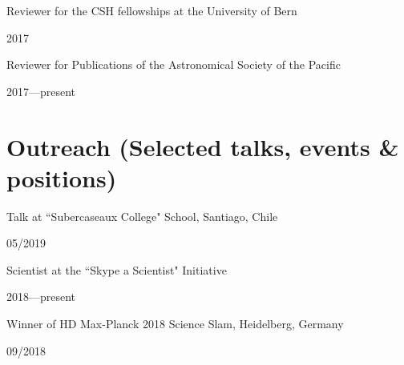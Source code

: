 \documentclass[12pt, a4paper]{article} %
\begin{document}
\begin{minipage}[t]{0.7\textwidth}
\begin{flushleft}%
  \setlength{\leftskip}{0.2cm}%
Reviewer for the CSH fellowships at the University of Bern 
\end{flushleft}
\end{minipage}
\begin{minipage}[t]{0.3\textwidth}
\hfill 2017
\end{minipage}

\begin{minipage}[t]{0.7\textwidth}
\begin{flushleft}%
  \setlength{\leftskip}{0.2cm}%
Reviewer for Publications of the Astronomical Society of the Pacific 
\end{flushleft}
\end{minipage}
\begin{minipage}[t]{0.3\textwidth}
\hfill 2017---present
\end{minipage}

\section*{Outreach (Selected talks, events \& positions)}

\begin{minipage}[t]{0.7\textwidth}
\begin{flushleft}%
  \setlength{\leftskip}{0.2cm}%
Talk at ``Subercaseaux College" School, Santiago, Chile
\end{flushleft}
\end{minipage}
\begin{minipage}[t]{0.3\textwidth}
\hfill 05/2019
\end{minipage}

\begin{minipage}[t]{0.7\textwidth}
\begin{flushleft}%
  \setlength{\leftskip}{0.2cm}%
Scientist at the ``Skype a Scientist" Initiative
\end{flushleft}
\end{minipage}
\begin{minipage}[t]{0.3\textwidth}
\hfill 2018---present
\end{minipage}

\begin{minipage}[t]{0.7\textwidth}
\begin{flushleft}%
  \setlength{\leftskip}{0.2cm}%
Winner of HD Max-Planck 2018 Science Slam, Heidelberg, Germany 
\end{flushleft}
\end{minipage}
\begin{minipage}[t]{0.3\textwidth}
\hfill 09/2018
\end{minipage}
\end{document}
